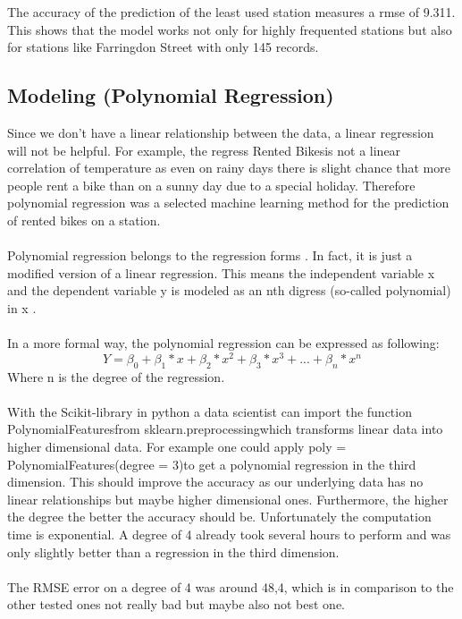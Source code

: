The accuracy of the prediction of the least used station measures a \acs{rmse} of 9.311. This shows that the model works not only for highly frequented stations but also for stations like Farringdon Street with only 145 records.
\subsection{Modeling (Polynomial Regression)}\label{poly}
Since we don't have a linear relationship between the data, a linear regression will not be helpful.
For example, the regress \glqq Rented Bikes\grqq is not a linear correlation of temperature as even on rainy
days there is slight chance that more people rent a bike than on a sunny day due to a special
holiday. Therefore polynomial regression was a selected machine learning method for the
prediction of rented bikes on a station.\\\\
Polynomial regression belongs to the regression forms \cite{RN9}. In fact, it is just a modified version of a
linear regression. This means the independent variable x and the dependent variable y is modeled
as an nth digress (so-called polynomial) in x \cite{RN9}.\\\\
In a more formal way, the polynomial regression can be expressed as following:
$$Y=\beta_0+\beta_1* x+\beta_2 * x^2 + \beta_3 * x^3 + ... + \beta_n * x^n$$
Where n is the degree of the regression.\\\\
With the Scikit-library in python a data scientist can import the function \glqq PolynomialFeatures\grqq from
\glqq sklearn.preprocessing\grqq which transforms linear data into higher dimensional data. For example
one could apply \glqq poly = PolynomialFeatures(degree = 3)\grqq to get a polynomial
regression in the third dimension. This should improve the accuracy as our underlying data has
no linear relationships but maybe higher dimensional ones. Furthermore, the higher the degree
the better the accuracy should be. Unfortunately the computation time is exponential. A degree of
4 already took several hours to perform and was only slightly better than a regression in the third
dimension.\\\\
The RMSE error on a degree of 4 was around 48,4, which is in comparison to the other tested
ones not really bad but maybe also not best one.\\\\
